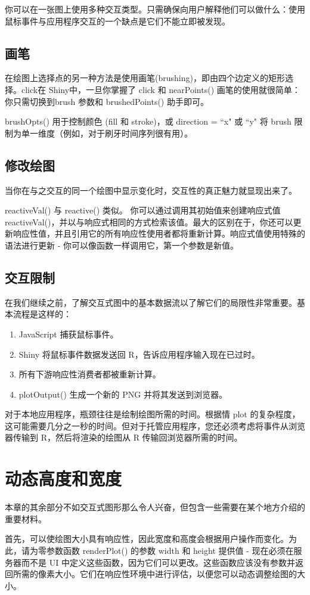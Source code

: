 你可以在一张图上使用多种交互类型。只需确保向用户解释他们可以做什么：使用鼠标事件与应用程序交互的一个缺点是它们不能立即被发现。

\subsection{画笔}
在绘图上选择点的另一种方法是使用画笔(brushing)，即由四个边定义的矩形选择。click在 Shiny中，一旦你掌握了 click 和 nearPoints() 画笔的使用就很简单：你只需切换到brush 参数和 brushedPoints() 助手即可。

brushOpts() 用于控制颜色 (fill 和 stroke)，或 direction = ``x" 或 ``y" 将 brush 限制为单一维度（例如，对于刷牙时间序列很有用）。
\subsection{修改绘图}
当你在与之交互的同一个绘图中显示变化时，交互性的真正魅力就显现出来了。

reactiveVal() 与 reactive() 类似。 你可以通过调用其初始值来创建响应式值 reactiveVal()，并以与响应式相同的方式检索该值。最大的区别在于，你还可以更新响应性值，并且引用它的所有响应性使用者都将重新计算。响应式值使用特殊的语法进行更新 - 你可以像函数一样调用它，第一个参数是新值。

\subsection{交互限制}
在我们继续之前，了解交互式图中的基本数据流以了解它们的局限性非常重要。基本流程是这样的：
\begin{enumerate}
    \item JavaScript 捕获鼠标事件。
    \item Shiny 将鼠标事件数据发送回 R，告诉应用程序输入现在已过时。
    \item 所有下游响应性消费者都被重新计算。
    \item plotOutput() 生成一个新的 PNG 并将其发送到浏览器。
\end{enumerate}
对于本地应用程序，瓶颈往往是绘制绘图所需的时间。根据情 plot 的复杂程度，这可能需要几分之一秒的时间。但对于托管应用程序，您还必须考虑将事件从浏览器传输到 R，然后将渲染的绘图从 R 传输回浏览器所需的时间。
\section{动态高度和宽度}
本章的其余部分不如交互式图形那么令人兴奋，但包含一些需要在某个地方介绍的重要材料。

首先，可以使绘图大小具有响应性，因此宽度和高度会根据用户操作而变化。为此，请为零参数函数 renderPlot() 的参数 width 和 height 提供值 - 现在必须在服务器而不是 UI 中定义这些函数，因为它们可以更改。这些函数应该没有参数并返回所需的像素大小。它们在响应性环境中进行评估，以便您可以动态调整绘图的大小。

